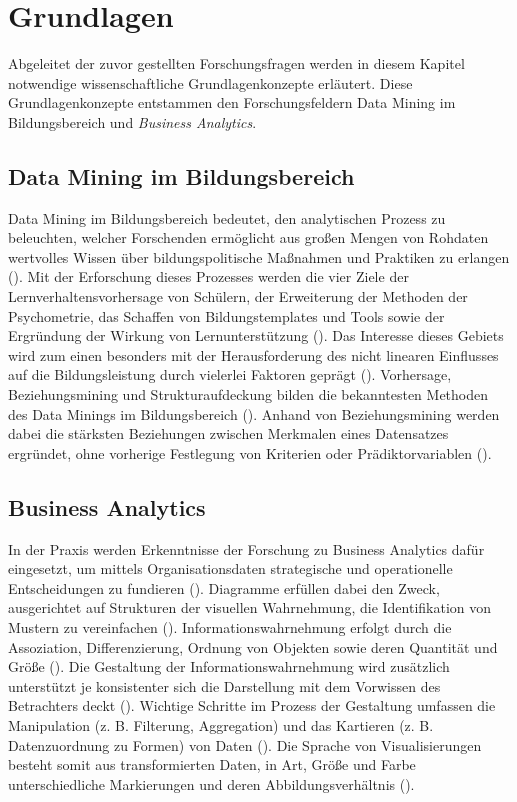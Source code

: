 \chapter[Grundlagen]{Grundlagen}
\label{chap:literature}

Abgeleitet der zuvor gestellten Forschungsfragen werden in diesem Kapitel notwendige wissenschaftliche Grundlagenkonzepte erläutert.
Diese Grundlagenkonzepte entstammen den Forschungsfeldern Data Mining im Bildungsbereich und \textit{Business Analytics}.

\section[Data Mining im Bildungsbereich]{Data Mining im Bildungsbereich}

Data Mining im Bildungsbereich bedeutet, den analytischen Prozess zu beleuchten, welcher Forschenden ermöglicht aus großen Mengen von Rohdaten wertvolles Wissen über bildungspolitische Maßnahmen und Praktiken zu erlangen (\cite[S. 1]{Gamazo.2020}).
Mit der Erforschung dieses Prozesses werden die vier Ziele der Lernverhaltensvorhersage von Schülern, der Erweiterung der Methoden der Psychometrie, das Schaffen von Bildungstemplates und Tools sowie der Ergründung der Wirkung von Lernunterstützung (\cite[S. 2]{P.Bachhal.2021}).
Das Interesse dieses Gebiets wird zum einen besonders mit der Herausforderung des nicht linearen Einflusses auf die Bildungsleistung durch vielerlei Faktoren geprägt (\cite[S. 1]{Khan.2021}).
Vorhersage, Beziehungsmining und Strukturaufdeckung bilden die bekanntesten Methoden des Data Minings im Bildungsbereich (\cite[S. 3]{Gamazo.2020}).
Anhand von Beziehungsmining werden dabei die stärksten Beziehungen zwischen Merkmalen eines Datensatzes ergründet, ohne vorherige Festlegung von Kriterien oder Prädiktorvariablen (\cite[S. 3]{Gamazo.2020}).

\section[Business Analytics]{Business Analytics}

In der Praxis werden Erkenntnisse der Forschung zu Business Analytics dafür eingesetzt, um mittels Organisationsdaten strategische und operationelle Entscheidungen zu fundieren (\cite[S. 1]{Qin.2020}).
Diagramme erfüllen dabei den Zweck, ausgerichtet auf Strukturen der visuellen Wahrnehmung, die Identifikation von Mustern zu vereinfachen (\cite[S. 287]{Baars2021}).
Informationswahrnehmung erfolgt durch die Assoziation, Differenzierung, Ordnung von Objekten sowie deren Quantität und Größe (\cite[S. 287]{Baars2021}).
Die Gestaltung der Informationswahrnehmung wird zusätzlich unterstützt je konsistenter sich die Darstellung mit dem Vorwissen des Betrachters deckt (\cite[S. 288]{Baars2021}).
Wichtige Schritte im Prozess der Gestaltung umfassen die Manipulation (z. B. Filterung, Aggregation) und das Kartieren (z. B. Datenzuordnung zu Formen) von Daten (\cite[S. 2]{Qin.2020}).
Die Sprache von Visualisierungen besteht somit aus transformierten Daten, in Art, Größe und Farbe unterschiedliche Markierungen und deren Abbildungsverhältnis (\cite[S. 3]{Qin.2020}).